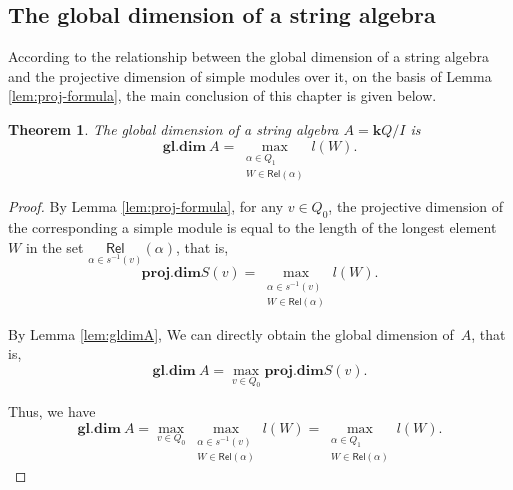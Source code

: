 \documentclass[11pt]{amsart}
\numberwithin{equation}{section}
\newtheorem{theorem}{Theorem}[section]
\theoremstyle{definition}
\begin{document}
\subsection{The global dimension of a string algebra}\label{subsection: The global dimension of a string algebra}
According to the relationship between the global dimension of a string algebra and the projective dimension of simple modules over it, on the basis of Lemma \ref{lem:proj-formula}, the main conclusion of this chapter is given below.

\begin{theorem}\label{thm:gldim}
	The global dimension of a string algebra \( A = \mathbf{k}Q/I \) is
	\[
	\textbf{gl.dim}~A = \max\limits_{\substack{\alpha \in Q_1 \\ W \in \mathsf{Rel}(\alpha)}} l(W).
	\]
\end{theorem}
\begin{proof}
	 By Lemma \ref{lem:proj-formula}, for any \( v \in Q_0 \), the projective dimension of the corresponding a simple module is equal to the length of the longest element \( W \) in the set \( \underset{\alpha \in s^{-1}(v)}{\mathsf{Rel}}(\alpha) \), that is,
	\[
	\textbf{proj.dim} S(v) = \max\limits_{\substack{\alpha \in s^{-1}(v) \\ W \in \mathsf{Rel}(\alpha)}} l(W).
	\]
	
	By Lemma \ref{lem:gldimA}, We can directly obtain the global dimension of $A$, that is,
	\[
	\textbf{gl.dim}~A = \max\limits_{v \in Q_0} \textbf{proj.dim} S(v).
	\]
	
	\noindent Thus, we have
	\[
	\textbf{gl.dim}~A = \max\limits_{v \in Q_0} \max\limits_{\substack{\alpha \in s^{-1}(v) \\ W \in \mathsf{Rel}(\alpha)}} l(W) = \max\limits_{\substack{\alpha \in Q_1 \\ W \in \mathsf{Rel}(\alpha)}} l(W).
	\]
\end{proof}
\end{document}
